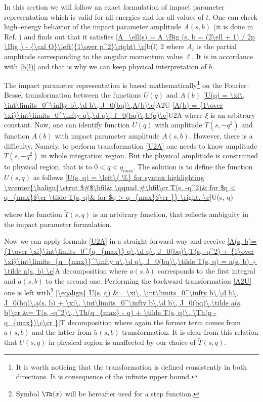 In this section we will follow an exact formulation of impact parameter representation  which is valid for all energies and for all values of $t$. One can check high--energy behavior of the impact parameter amplitude $A(s, b)$ (it is done in Ref. ) and finds out that it satisfies
\eqref{A_\ell(s) = A \Big (s, b = (2\ell + 1) / 2p \Big ) - {\cal O}\left({1\over p^2}\right) \c}{b(l) 2}
where $A_\ell$ is the partial amplitude corresponding to the angular momentum value $\ell$. It is in accordance with \equ{} \ref{b(l)} and that is why we can keep physical interpretation of $b$.

The impact parameter representation is based mathematically\footnote{It is worth noticing that the transformation is defined consistently in both directions. It is consequence of the infinite upper bound.} on the Fourier--Bessel transformation between the functions $U(q)$ and $A(b)$
\eqref{U(q) = \xi\, \int\limits_0^\infty b\,\d b\, J_0(bq)\,A(b)\c}{A2U}
\eqref{A(b) = {1\over \xi}\int\limits_0^\infty q\,\d q\, J_0(bq)\,U(q)\c}{U2A}
where $\xi$ is an arbitrary constant. Now, one can identify function $U(q)$ with amplitude $T(s, -q^2)$ and function $A(b)$ with impact parameter amplitude $A(s, b)$. However, there is a difficulty. Namely, to perform transformation \ref{U2A} one needs to know amplitude $T(s, -q^2)$ in whole integration region. But the physical amplitude is constrained to physical region, that is to $0 < q < q_{max}$. The solution is to define the function $U(s, q)$ as follows
\eqref{U(s, q) = \left\{ %
\vcenter{\halign{\strut $#$\hfil& \qquad #\hfil\cr
T(s, -q^2)& for $q < q_{max}$\cr 
\tilde T(s, q)& for $q > q_{max}$\cr
}} \right. \c}{U(s, q)} 

where the function $\tilde T(s, q)$ is an arbitrary function, that reflects ambiguity in the impact parameter formulation.

Now we can apply formula \ref{U2A} in a straight-forward way and receive
\eqref{A(s, b)= {1\over \xi}\int\limits_0^{q_{max}} q\,\d q\, J_0(bq)\,T(s, -q^2)  +  {1\over \xi}\int\limits_{q_{max}}^\infty q\,\d q\, J_0(bq)\,\tilde T(s, q) = a(s, b) + \tilde a(s, b) \c}{A decomposition}
where $a(s, b)$ corresponds to the first integral and $\tilde a(s, b)$ to the second one. Performing the backward transformation \ref{A2U} one is left with\footnote{Symbol $\Th(x)$ will be hereafter used for a step function.}
\eqref{\eqalign{
U(s, q) &= \xi\, \int\limits_0^\infty b\,\d b\, J_0(bq)\,a(s, b) + \xi\, \int\limits_0^\infty b\,\d b\, J_0(bq)\,\tilde a(s, b)\cr
&= T(s, -q^2)\, \Th(q_{max} - q) +  \tilde T(s, q)\, \Th(q - q_{max})\c\cr
}}{T decomposition}
where again the former term comes from $a(s, b)$ and the latter from $\tilde a(s, b)$ transformation. It is clear from this relation that $U(s, q)$ in physical region is unaffected by our choice of $\tilde T(s, q)$. 

